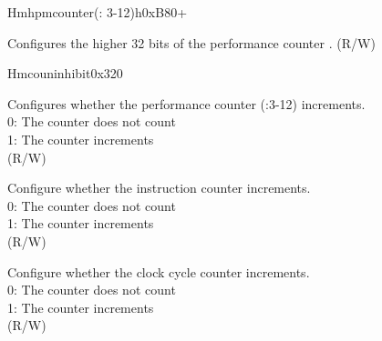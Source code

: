 \begin{register}{H}{mhpmcounter(: 3-12)h}{0xB80+}\label{regdesc:LPMHPMCOUNTERH}
%
\regnewline%
\begin{regdesc}\begin{reglist}
\label{fielddesc:LPMHMPCOUNTERH}\item [MHPMCOUNTER\regindex{n}h] Configures the higher 32 bits of the performance counter . (R/W)
\end{reglist}\end{regdesc}
\end{register}


\begin{register}{H}{mcouninhibit}{0x320}\label{regdesc:LPMCOUNTINHIBIT}
%
%
%
%
\regnewline%
\begin{regdesc}\begin{reglist}
\label{fielddesc:LPMCOUNTINHIBITHPM}\item [HPM] Configures whether the performance counter (:3-12) increments. \\
0: The counter does not count\\
1: The counter increments\\
(R/W)
\label{fielddesc:LPMCOUNTINHIBITIR}\item [IR] Configure whether the instruction counter increments. \\
0: The counter does not count\\
1: The counter increments\\
(R/W)
\label{fielddesc:LPMCOUNTINHIBITCY}\item [CY] Configure whether the clock cycle counter increments. \\
0: The counter does not count\\
1: The counter increments\\
(R/W)
\end{reglist}\end{regdesc}
\end{register}
